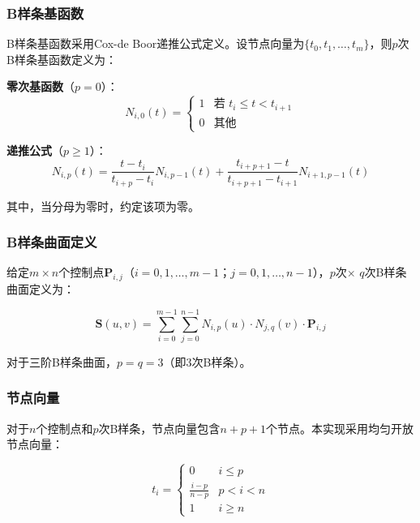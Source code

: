\documentclass[12pt,a4paper]{article}
\begin{document}
\subsubsection{B样条基函数}

B样条基函数采用Cox-de Boor递推公式定义。设节点向量为$\{t_0, t_1, \ldots, t_m\}$，则$p$次B样条基函数定义为：

\textbf{零次基函数}（$p=0$）：
\begin{equation}
N_{i,0}(t) = \begin{cases}
1 & \text{若 } t_i \leq t < t_{i+1} \\
0 & \text{其他}
\end{cases}
\end{equation}

\textbf{递推公式}（$p \geq 1$）：
\begin{equation}
N_{i,p}(t) = \frac{t - t_i}{t_{i+p} - t_i} N_{i,p-1}(t) + \frac{t_{i+p+1} - t}{t_{i+p+1} - t_{i+1}} N_{i+1,p-1}(t)
\end{equation}

其中，当分母为零时，约定该项为零。

\subsubsection{B样条曲面定义}

给定$m \times n$个控制点$\mathbf{P}_{i,j}$（$i=0,1,\ldots,m-1$；$j=0,1,\ldots,n-1$），$p$次$\times$ $q$次B样条曲面定义为：

\begin{equation}
\mathbf{S}(u,v) = \sum_{i=0}^{m-1} \sum_{j=0}^{n-1} N_{i,p}(u) \cdot N_{j,q}(v) \cdot \mathbf{P}_{i,j}
\end{equation}

对于三阶B样条曲面，$p = q = 3$（即3次B样条）。

\subsubsection{节点向量}

对于$n$个控制点和$p$次B样条，节点向量包含$n+p+1$个节点。本实现采用均匀开放节点向量：

\begin{equation}
t_i = \begin{cases}
0 & i \leq p \\
\frac{i-p}{n-p} & p < i < n \\
1 & i \geq n
\end{cases}
\end{equation}
\end{document}
